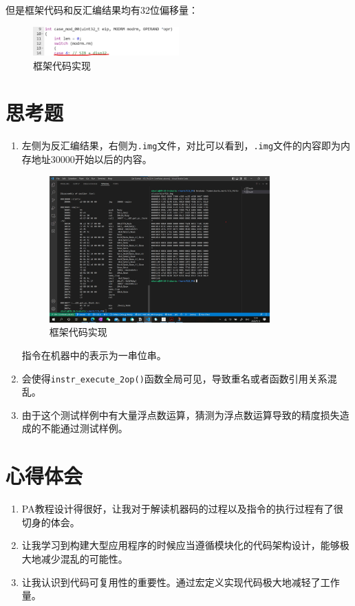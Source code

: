 \documentclass[UTF8]{ctexart}
\begin{document}
但是框架代码和反汇编结果均有32位偏移量：
\begin{figure}[H]
    \centering
    \includegraphics[width=0.5\textwidth]{5.png}
    \caption{框架代码实现}
\end{figure}

\section{思考题}
\begin{enumerate}
    \item 左侧为反汇编结果，右侧为\verb|.img|文件，对比可以看到，\verb|.img|文件的内容即为内存地址30000开始以后的内容。
    \begin{figure}[H]
        \centering
        \includegraphics[width=0.8\textwidth]{6.jpg}
        \caption{框架代码实现}
    \end{figure}
    指令在机器中的表示为一串位串。
    \item 会使得\verb|instr_execute_2op()|函数全局可见，导致重名或者函数引用关系混乱。
    \item 由于这个测试样例中有大量浮点数运算，猜测为浮点数运算导致的精度损失造成的不能通过测试样例。
\end{enumerate}

\section{心得体会}
\begin{enumerate}
    \item PA教程设计得很好，让我对于解读机器码的过程以及指令的执行过程有了很切身的体会。
    \item 让我学习到构建大型应用程序的时候应当遵循模块化的代码架构设计，能够极大地减少混乱的可能性。
    \item 让我认识到代码可复用性的重要性。通过宏定义实现代码极大地减轻了工作量。
\end{enumerate}
\end{document}
